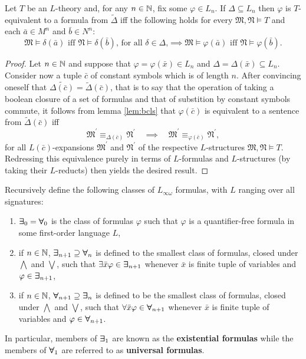 \begin{prp}\label{prp:bcls}
	Let $T$ be an $L$-theory and, for any $n\in\mathbb{N}$, fix some $\varphi\in L_n$.  If $\Delta\subseteq L_n$ then $\varphi$ is $T$-equivalent to a formula from $\widetilde{\Delta}$ iff the following holds for every $\mathfrak{M},\mathfrak{N}\models T$ and each $\bar{a}\in M^n$ and $\bar{b}\in N^n$:
	\begin{equation}
		\mathfrak{M}\models\delta(\bar{a})\text{ iff }\mathfrak{N}\models\delta(\bar{b})\text{, for all $\delta\in\Delta$,} \implies \mathfrak{M}\models\varphi(\bar{a})\text{ iff }\mathfrak{N}\models\varphi(\bar{b}).
	\end{equation}
\end{prp}
\begin{proof}
	Let $n\in\mathbb{N}$ and suppose that $\varphi=\varphi(\bar{x})\in L_n$ and $\Delta=\Delta(\bar{x})\subseteq L_n$.  Consider now a tuple $\bar{c}$ of constant symbols which is of length $n$.  After convincing oneself that $\widetilde{\Delta(\bar{c})}=\widetilde{\Delta}(\bar{c})$, that is to say that the operation of taking a boolean closure of a set of formulas and that of substition by constant symbols commute, it follows from lemma \ref{lem:bcls} that $\varphi(\bar{c})$ is equivalent to a sentence from $\widetilde{\Delta}(\bar{c})$ iff
	\begin{equation}
		\mathfrak{M}^\prime\equiv_{\Delta(\bar{c})}\mathfrak{N}^\prime \quad\implies\quad \mathfrak{M}^\prime\equiv_{\varphi(\bar{c})}\mathfrak{N}^\prime,
	\end{equation}
	for all $L(\bar{c})$-expansions $\mathfrak{M}^\prime$ and $\mathfrak{N}^\prime$ of the respective $L$-structures $\mathfrak{M},\mathfrak{N}\models T$.  Redressing this equivalence purely in terms of $L$-formulas and $L$-structures (by taking their $L$-reducts) then yields the desired result.
\end{proof}

\begin{dfn}
	Recursively define the following classes of $L_{\infty\omega}$ formulas, with $L$ ranging over all signatures:
	\begin{enumerate}
		\item	$\bm{\exists}_{0}=\bm{\forall}_{0}$ is the class of formulas $\varphi$ such that $\varphi$ is a quantifier-free formula in some first-order language $L$,
		\item	if $n\in\mathbb{N}$, $\bm{\exists}_{n+1}\supseteq\bm{\forall}_{n}$ is defined to the smallest class of formulas, closed under $\bigwedge$ and $\bigvee$, such that $\exists\bar{x}\varphi\in\bm{\exists}_{n+1}$ whenever $\bar{x}$ is finite tuple of variables and $\varphi\in\bm{\exists}_{n+1}$,
		\item	if $n\in\mathbb{N}$, $\bm{\forall}_{n+1}\supseteq\bm{\exists}_{n}$ is defined to be the smallest class of formulas, closed under $\bigwedge$ and $\bigvee$, such that $\forall\bar{x}\varphi\in\bm{\forall}_{n+1}$ whenever $\bar{x}$ is finite tuple of variables and $\varphi\in\bm{\forall}_{n+1}$.
	\end{enumerate}
	In particular, members of $\bm{\exists}_{1}$ are known as the \textbf{existential formulas} while the members of $\bm{\forall}_{1}$ are referred to as \textbf{universal formulas}.
\end{dfn}

